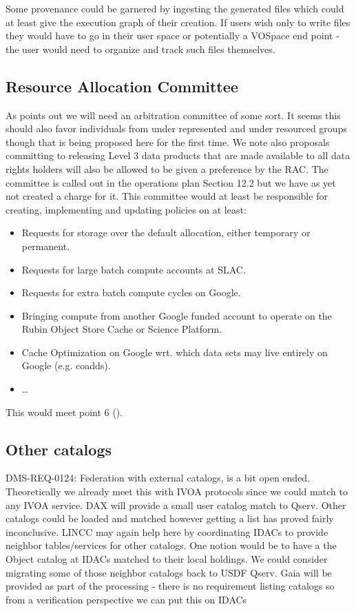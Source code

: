 Some provenance could be garnered by ingesting the generated files which could at least give the execution graph of their creation.
If users wish only to write files they would have to go in their user space or potentially a VOSpace end point - the user would need to organize and track such files themselves.


\subsection{Resource Allocation Committee}\label{sec:arbitration}
As  points out we will need an arbitration committee of some sort.
It seems this should also favor individuals from under represented  and under resourced groups though that is being proposed here for the first time.
We note also  proposals committing to releasing Level 3 data products that are made available to all data rights holders will also  be allowed to be given a preference by the RAC.
The committee is called out in the operations plan  Section 12.2 but we have as yet not created a charge for it.
This committee would at least be responsible for creating, implementing and updating  policies on at least:

\begin{itemize}
\item Requests for storage over the default allocation, either temporary or permanent.
\item Requests for large batch compute accounts at SLAC.
\item Requests for extra batch compute cycles on Google.
\item Bringing compute from another Google funded account to operate on the Rubin Object Store Cache or Science Platform.
\item Cache Optimization on Google wrt. which data sets may live entirely on Google (e.g. coadds).
\item \ldots
\end{itemize}

This would meet  point 6  ().

\subsection{Other catalogs}

DMS-REQ-0124: Federation with external catalogs, is a bit open ended.
Theoretically we already meet this with IVOA protocols since we could match to any IVOA service.
DAX will provide a small user catalog match to Qserv.
Other catalogs could be loaded and matched however getting a list has proved fairly inconclusive.
LINCC may again help here by coordinating IDACs to provide neighbor tables/services for other catalogs.
One notion would be to have a the Object catalog at IDACs matched to their local holdings.
We could consider migrating some of those neighbor catalogs back to USDF Qserv.
Gaia will be provided as part of the processing - there is no requirement listing catalogs so from a verification perspective we can put this on IDACs

